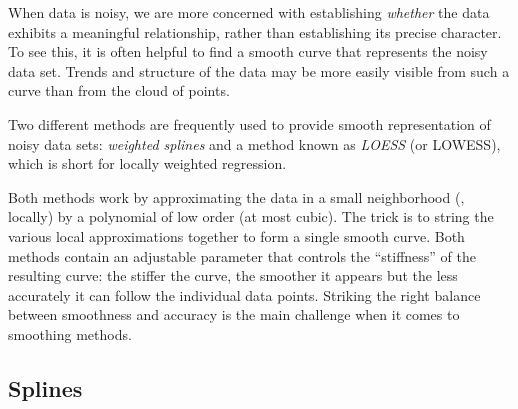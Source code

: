 When data is noisy, we are more concerned with establishing
\emph{whether} the data exhibits a meaningful relationship, rather\vadjust{\pagebreak}
than establishing its precise character. To see this, it is often
helpful to find a smooth curve that represents the noisy data set.
Trends and structure of the data may be more easily visible from such
a curve than from the cloud of points.

Two different methods are frequently used to provide smooth
representation of noisy data sets: \emph{weighted splines} and
a method known as \emph{LOESS} (or LOWESS), which is short for
locally weighted regression.

Both methods work by approximating the data in a small neighborhood
(\ie, locally) by a polynomial of low order (at most cubic). The trick
is to string the various local approximations together to form a
single smooth curve. Both methods contain an adjustable parameter that
controls the ``stiffness'' of the resulting curve: the stiffer the
curve, the smoother it appears but the less accurately it can follow
the individual data points. Striking the right balance between
smoothness and accuracy is the main challenge when it comes to
smoothing methods.

\spreadlong{-12pt}

\vspace*{-6pt}
\subsection{Splines}


